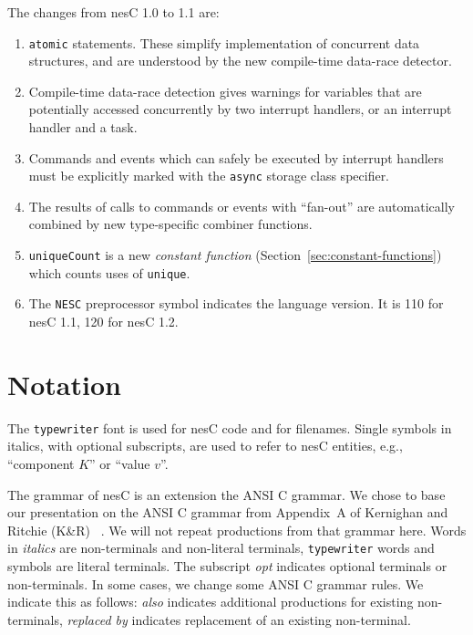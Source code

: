\documentclass[11pt,letterpaper]{article}
\newcommand{\kw}[1]{{\tt #1}}
\newcommand{\code}[1]{{\tt #1}}
\newcommand{\nesc}{nesC\xspace}
\begin{document}
The changes from \nesc 1.0 to 1.1 are:
\begin{enumerate}
\item \kw{atomic} statements. These simplify implementation of concurrent
data structures, and are understood by the new compile-time data-race
detector.

\item Compile-time data-race detection gives warnings for variables that
are potentially accessed concurrently by two interrupt handlers, or an
interrupt handler and a task.

\item Commands and events which can safely be executed by interrupt
handlers must be explicitly marked with the \kw{async} storage class
specifier.

\item The results of calls to commands or events with ``fan-out'' are
automatically combined by new type-specific combiner functions.

\item \code{uniqueCount} is a new \emph{constant function}
(Section~\ref{sec:constant-functions}) which counts uses of \code{unique}.

\item The \kw{NESC} preprocessor symbol indicates the language version. It
is 110 for \nesc 1.1, 120 for \nesc 1.2.
 
\end{enumerate}

\section{Notation}
\label{sec:notation}

The \texttt{typewriter} font is used for \nesc code and for
filenames. Single symbols in italics, with optional subscripts, are used to
refer to \nesc entities, e.g., ``component $K$'' or ``value $v$''.

The grammar of \nesc is an extension the ANSI C grammar. We chose to base
our presentation on the ANSI C grammar from Appendix~A of Kernighan and
Ritchie (K\&R) ~\cite[pp234--239]{kandr}. We will not repeat productions
from that grammar here. Words in \emph{italics} are non-terminals and
non-literal terminals, \kw{typewriter} words and symbols are literal
terminals. The subscript \emph{opt} indicates optional terminals or
non-terminals. In some cases, we change some ANSI C grammar rules. We
indicate this as follows: \emph{also} indicates additional productions for
existing non-terminals, \emph{replaced by} indicates replacement of an
existing non-terminal. 
\end{document}
